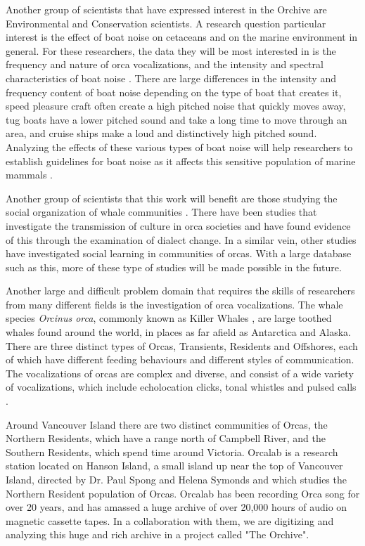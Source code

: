 \documentclass[12pt,oneside]{book}
\begin{document}
Another group of scientists that have expressed interest in the
Orchive are Environmental and Conservation scientists. A research
question particular interest is the effect of boat noise
\cite{foote04_orca_boat_noise} on cetaceans and on the marine
environment in general.  For these researchers, the data they will be
most interested in is the frequency and nature of orca vocalizations,
and the intensity and spectral characteristics of boat noise
\cite{holt09_orca_speaking_up}.  There are large differences in the
intensity and frequency content of boat noise depending on the type of
boat that creates it, speed pleasure craft often create a high pitched
noise that quickly moves away, tug boats have a lower pitched sound
and take a long time to move through an area, and cruise ships make a
loud and distinctively high pitched sound.  Analyzing the effects of
these various types of boat noise will help researchers to establish
guidelines for boat noise as it affects this sensitive population of
marine mammals \cite{doksaeter09_orca_herring_feeding}.

Another group of scientists that this work will benefit are those
studying the social organization of whale communities
\cite{bigg90_orca_genealogy}.  There have been studies that
investigate the transmission of culture in orca societies
\cite{deecke00} and have found evidence of this through the
examination of dialect change.  In a similar vein, other studies have
investigated social learning \cite{janik00_orca_social_communication}
in communities of orcas.  With a large database such as this, more of
these type of studies will be made possible in the future.

Another large and difficult problem domain that requires the skills of
researchers from many different fields is the investigation of orca
vocalizations.  The whale species \emph{Orcinus orca}, commonly known
as Killer Whales \cite{ford00_book_killer_whales}, are large toothed
whales found around the world, in places as far afield as Antarctica
and Alaska\cite{estes09_orca_alaska_decline}.  There are three
distinct types of Orcas, Transients, Residents and Offshores, each of
which have different feeding behaviours and different styles of
communication.  The vocalizations of orcas are complex and diverse,
and consist of a wide variety of vocalizations, which include
echolocation clicks, tonal whistles and pulsed calls \cite{deecke00}.

Around Vancouver Island there are two distinct communities of Orcas,
the Northern Residents, which have a range north of Campbell River,
and the Southern Residents, which spend time around Victoria.  Orcalab
is a research station located on Hanson Island, a small island up near
the top of Vancouver Island, directed by Dr. Paul Spong and Helena
Symonds and which studies the Northern Resident population of Orcas.
Orcalab has been recording Orca song for over 20 years, and has
amassed a huge archive of over 20,000 hours of audio on magnetic
cassette tapes.  In a collaboration with them, we are digitizing and
analyzing this huge and rich archive in a project called "The
Orchive".
\end{document}

